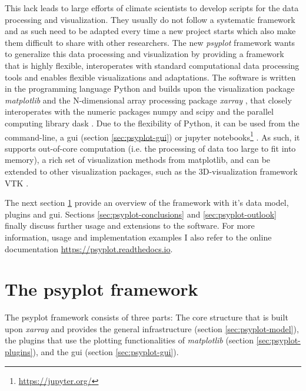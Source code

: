 \begin{refsection}
This lack leads to large efforts of climate scientists to develop scripts for the data processing and visualization. They usually do not follow a systematic framework and as such need to be adapted every time a new project starts which also make them difficult to share with other researchers. The new \textit{psyplot} framework wants to generalize this data processing and visualization by providing a framework that is highly flexible, interoperates with standard computational data processing tools and enables flexible visualizations and adaptations. The software is written in the programming language Python \citep{PerezGrangerHunter2011} and builds upon the visualization package \textit{matplotlib} \citep{Hunter2007} and the N-dimensional array processing package \textit{xarray} \citep{HoyerHamman2017}, that closely interoperates with the numeric packages numpy and scipy \citep{JonesOliphantPetersonEtAl2001, Oliphant2006} and the parallel computing library dask \citep{DDT2016}. Due to the flexibility of Python, it can be used from the command-line, a \gls{gui} (section \ref{sec:psyplot-gui}) or jupyter notebooks\footnote{\url{https://jupyter.org/}} \citep{KluyverRaganKelleyPerezEtAl2016}. As such, it supports out-of-core computation (i.e. the processing of data too large to fit into memory), a rich set of visualization methods from matplotlib, and can be extended to other visualization packages, such as the 3D-visualization framework VTK \citep{Sommer2019a}.

The next section \ref{sec:psyplot-framework} provide an overview of the framework with it's data model, plugins and \gls{gui}. Sections \ref{sec:psyplot-conclusions} and \ref{sec:psyplot-outlook} finally discuss further usage and extensions to the software. For more information, usage and implementation examples I also refer to the online documentation \url{https://psyplot.readthedocs.io}.

\section{The psyplot framework}  \label{sec:psyplot-framework}

The psyplot framework consists of three parts: The core structure that is built upon \textit{xarray} and provides the general infrastructure (section \ref{sec:psyplot-model}), the plugins that use the plotting functionalities of \textit{matplotlib} (section \ref{sec:psyplot-plugins}), and the \gls{gui} (section \ref{sec:psyplot-gui}).



\end{refsection}

